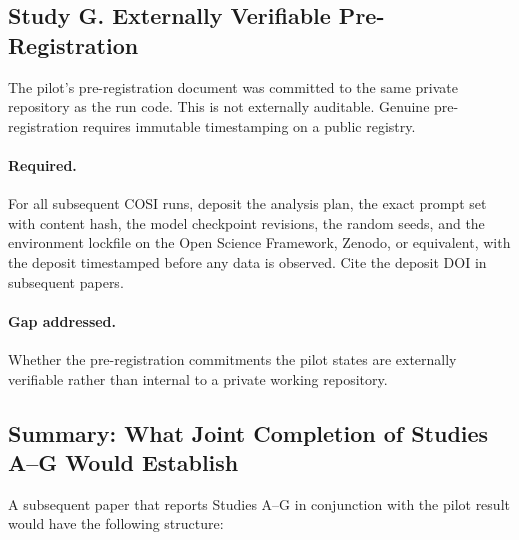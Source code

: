 \subsection{Study G. Externally Verifiable Pre-Registration}

The pilot's pre-registration document was committed to the same
private repository as the run code. This is not externally
auditable. Genuine pre-registration requires immutable timestamping
on a public registry.

\paragraph{Required.} For all subsequent COSI runs, deposit the
analysis plan, the exact prompt set with content hash, the model
checkpoint revisions, the random seeds, and the environment lockfile
on the Open Science Framework, Zenodo, or equivalent, with the
deposit timestamped before any data is observed. Cite the deposit
DOI in subsequent papers.

\paragraph{Gap addressed.} Whether the pre-registration commitments
the pilot states are externally verifiable rather than internal to a
private working repository.

\subsection{Summary: What Joint Completion of Studies A--G Would Establish}

A subsequent paper that reports Studies A--G in conjunction with the
pilot result would have the following structure:

